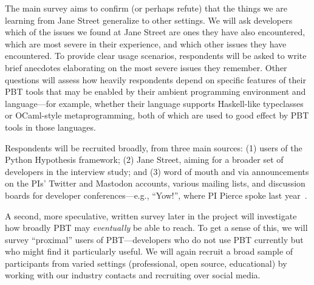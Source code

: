 The main survey
aims to confirm (or perhaps refute) that
the things we are learning from Jane Street generalize to other settings.
We will
ask developers which of the issues we found at Jane Street are
ones they have also encountered, which are most severe
in their experience, and which
other issues they have encountered.
To provide
clear usage scenarios, respondents will
be asked to write brief anecdotes elaborating on the
most severe issues they remember.  Other questions will assess how
heavily respondents depend on specific features of their PBT tools
that may be enabled by their
ambient programming environment and language---for example, whether their
language supports Haskell-like typeclasses or OCaml-style
metaprogramming, both of which are used to good effect by
PBT tools in those languages.

Respondents will
be recruited broadly, from three main sources: (1)
users of the Python Hypothesis framework; (2) Jane Street, aiming for
a broader set of developers in the interview study; and (3)
word of mouth and via announcements on the PIs' Twitter and Mastodon
accounts, various mailing lists, and discussion boards for developer
conferences---e.g., ``Yow!'', where PI Pierce spoke last
year~\cite{Pierce:Yow22}.  

A second, more speculative, written survey later in the project will investigate
how broadly PBT may {\em eventually} be able to reach.  To get a sense
of this, we will
survey ``proximal'' users of PBT---developers who do not use PBT
currently but who might find it particularly
useful.
We
will again recruit a broad sample of participants from varied settings
(professional, open source, educational) by working with our industry contacts
and recruiting over social media.
%
\iflater {}  \fi

